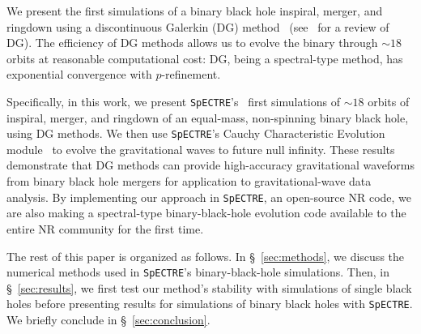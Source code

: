 \begin{bibunit}[unsrtnat]
We present the first simulations of a binary black hole inspiral, merger, and
ringdown using a discontinuous Galerkin (DG) method~\cite{reed1973triangular}
(see~\cite{Hesthaven2008} for a review of DG). The efficiency of DG methods
allows us to evolve the binary through $\sim18$ orbits at reasonable
computational cost:  DG, being a spectral-type method, has exponential
convergence with $p$-refinement. 

Specifically, in this work, we
present \texttt{SpECTRE}'s~\cite{spectrecode_2024} first simulations of $\sim18$
orbits of inspiral, merger, and ringdown of an equal-mass, non-spinning binary
black hole, using DG methods. We then use \texttt{SpECTRE}'s Cauchy
Characteristic Evolution module~ to evolve the gravitational waves to future null infinity.
These results demonstrate that DG methods can provide high-accuracy
gravitational waveforms from binary black hole mergers for application to
gravitational-wave data analysis. By implementing our approach in
\texttt{SpECTRE}, an open-source NR code, we are also making a
spectral-type binary-black-hole evolution code available to the entire
NR community for the first time.

The rest of this paper is organized as follows. In \S~\ref{sec:methods}, we
discuss the numerical methods used in \texttt{SpECTRE}'s binary-black-hole
simulations. Then, in \S~\ref{sec:results}, we first test our method's stability
with simulations of single black holes before presenting results for simulations
of binary black holes with \texttt{SpECTRE}. We briefly conclude in
\S~\ref{sec:conclusion}.


\end{bibunit}
